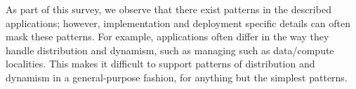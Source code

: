 As part of this survey, we observe that there exist patterns in the described
applications; however, implementation and deployment specific details can often
mask these patterns.  For example, applications often differ in the way they
handle distribution and dynamism, such as managing such as data/compute
localities. This makes it difficult to support patterns of distribution and
dynamism in a general-purpose fashion, for anything but the simplest patterns.





